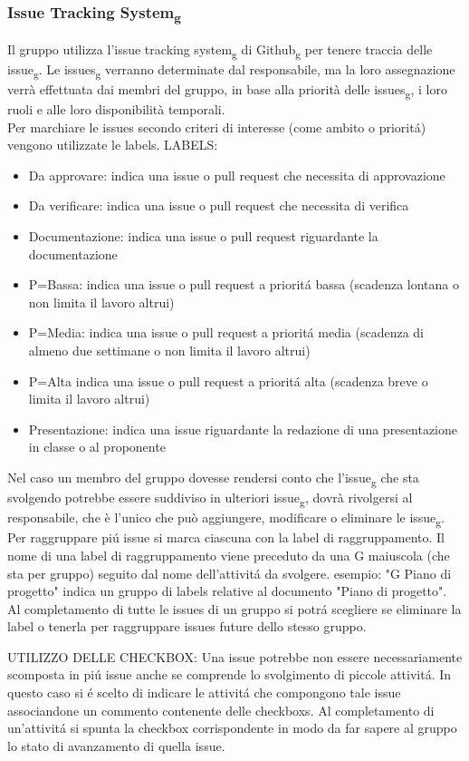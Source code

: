 \subsubsection{Issue Tracking System\textsubscript{g}}
Il gruppo utilizza l'issue tracking system\textsubscript{g} di Github\textsubscript{g} per tenere traccia delle issue\textsubscript{g}. 
Le issues\textsubscript{g} verranno determinate dal responsabile, ma la loro assegnazione verrà effettuata dai membri del gruppo, in base alla priorità delle issues\textsubscript{g}, i loro ruoli e alle loro disponibilità temporali.\\
Per marchiare le issues secondo criteri di interesse (come ambito o prioritá) vengono utilizzate le labels.
LABELS:
\begin{itemize}
	\item Da approvare: indica una issue o pull request che necessita di approvazione
	\item Da verificare: indica una issue o pull request che necessita di verifica
	\item Documentazione: indica una issue o pull request riguardante la documentazione
	\item P=Bassa: indica una issue o pull request a prioritá bassa (scadenza lontana o non limita il lavoro altrui)
	\item P=Media: indica una issue o pull request a prioritá media (scadenza di almeno due settimane o non limita il lavoro altrui)
	\item P=Alta indica una issue o pull request a prioritá alta (scadenza breve o limita il lavoro altrui)
	\item Presentazione: indica una issue riguardante la redazione di una presentazione in classe o al proponente
\end{itemize}

Nel caso un membro del gruppo dovesse rendersi conto che l'issue\textsubscript{g} che sta svolgendo potrebbe essere suddiviso in ulteriori issue\textsubscript{g}, dovrà rivolgersi al responsabile, che è l'unico che può aggiungere, modificare o eliminare le issue\textsubscript{g}.\\
Per raggruppare piú issue si marca ciascuna con la label di raggruppamento.
Il nome di una label di raggruppamento viene preceduto da una G maiuscola (che sta per gruppo) seguito dal nome dell'attivitá da svolgere. esempio: "G Piano di progetto"
indica un gruppo di labels relative al documento "Piano di progetto".
Al completamento di tutte le issues di un gruppo si potrá scegliere se eliminare la label o tenerla per raggruppare issues future dello stesso gruppo.

UTILIZZO DELLE CHECKBOX:
Una issue potrebbe non essere necessariamente scomposta in piú issue anche se comprende lo svolgimento di piccole attivitá.
In questo caso si é scelto di indicare le attivitá che compongono tale issue associandone un commento contenente delle checkboxs.
Al completamento di un'attivitá si spunta la checkbox corrispondente in modo da far sapere al gruppo lo stato di avanzamento di quella issue.